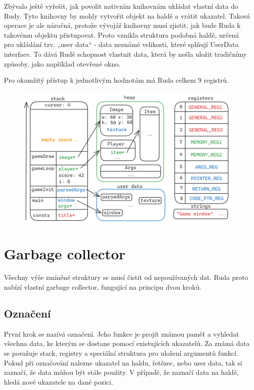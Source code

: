 \documentclass[12pt, a4paper,
twoside,        %
openright
]{report}
\begin{document}
Zbývalo ještě vyřešit, jak povolit nativním knihovnám ukládat vlastní data do Rudy. Tyto knihovny by mohly vytvořit objekt na haldě a vrátit ukazatel. Taková operace je ale náročná, protože vývojář knihovny musí zjistit, jak bude Ruda k takovému objektu přistupovat. Proto vznikla struktura podobná haldě, určená pro ukládání tzv. „user data“ - data neznámé velikosti, které splňují UserData interface. To dává Rudě schopnost vlastnit data, která by nešla uložit tradičnímy způsoby, jako například otevřené okno.

Pro okamžitý přístup k jednotlivým hodnotám má Ruda celkem 9 registrů.

\begin{figure}[h]
	\centering
	\includegraphics[width=0.8\linewidth]{image/memory.png}
\end{figure}

\section{Garbage collector}

Všechny výše zmíněné struktury se musí čistit od nepoužívaných dat. Ruda proto nabízí vlastní garbage collector, fungující na principu dvou kroků.

\subsection{Označení}

První krok se nazívá označení. Jeho funkce je projít známou paměť a vyhledat všechna data, ke kterým se dostane pomocí existujících ukazatelů. Za známá data se považuje stack, registry a speciální struktura pro uložení argumentů funkcí. Pokud při označování nalezne ukazatel na haldu, řetězec, nebo user data, tak si zaznačí, že data můžou být stále použity. V případě, že zaznačí data na haldě, hledá nové ukazatele na dané pozici.
\end{document}
